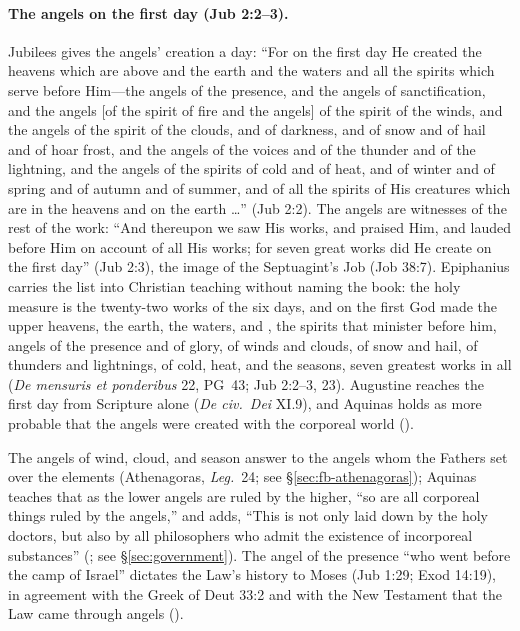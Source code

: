 \paragraph{The angels on the first day (Jub 2:2--3).} Jubilees gives the
angels' creation a day: ``For on the first day He created the heavens which
are above and the earth and the waters and all the spirits which serve
before Him---the angels of the presence, and the angels of sanctification,
and the angels [of the spirit of fire and the angels] of the spirit of the
winds, and the angels of the spirit of the clouds, and of darkness, and of
snow and of hail and of hoar frost, and the angels of the voices and of the
thunder and of the lightning, and the angels of the spirits of cold and of
heat, and of winter and of spring and of autumn and of summer, and of all
the spirits of His creatures which are in the heavens and on the earth
\dots'' (Jub 2:2). The angels are witnesses of the rest of the work: ``And thereupon we saw His
works, and praised Him, and lauded before Him on account of all His works;
for seven great works did He create on the first day'' (Jub 2:3), the image of the
Septuagint's Job (Job 38:7). Epiphanius carries the list into Christian
teaching without naming the book: the holy measure is the twenty-two works of
the six days, and on the first God made the upper heavens, the earth, the
waters, and , the spirits
that minister before him, angels of the presence and of glory, of winds and
clouds, of snow and hail, of thunders and lightnings, of cold, heat, and the
seasons, seven greatest works in all (\emph{De mensuris et ponderibus} 22,
PG~43; Jub 2:2--3, 23). Augustine reaches the first day from Scripture
alone (\emph{De civ.\ Dei} XI.9), and Aquinas holds as more probable that the
angels were created with the corporeal world ().

The angels of wind, cloud, and season answer to the angels whom the Fathers
set over the elements (Athenagoras, \emph{Leg.}\ 24; see
\S\ref{sec:fb-athenagoras}); Aquinas teaches that as the lower angels are
ruled by the higher, ``so are all corporeal things ruled by the angels,'' and
adds, ``This is not only laid down by the holy doctors, but also by all
philosophers who admit the existence of incorporeal substances'' (; see \S\ref{sec:government}). The angel of the presence ``who
went before the camp of Israel'' dictates the Law's history to Moses (Jub
1:29; Exod 14:19), in agreement with the Greek of Deut 33:2 and with the New
Testament that the Law came through angels ().

